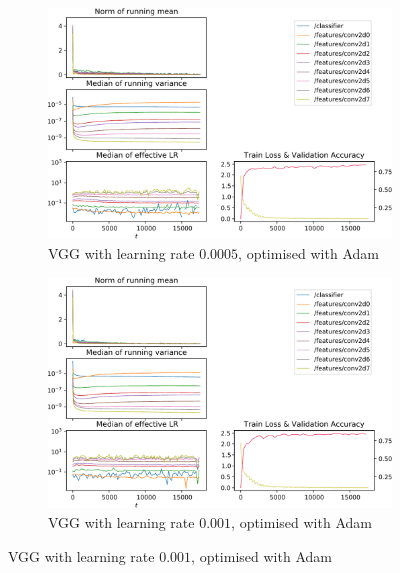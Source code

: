 \begin{figure}
    \begin{subfigure}{\textwidth}
        \centering
        \includegraphics[width=\linewidth]{gfx/diagrams/experiments/adam/vgg_adam_00005_0_-1.pdf}
        \caption{VGG with learning rate $0.0005$, optimised with Adam}
    \end{subfigure}

    \begin{subfigure}{\textwidth}
        \centering
        \includegraphics[width=\linewidth]{gfx/diagrams/experiments/adam/vgg_adam_0001_0_-1.pdf}
        \caption{VGG with learning rate $0.001$, optimised with Adam}
    \end{subfigure}


\end{figure}
